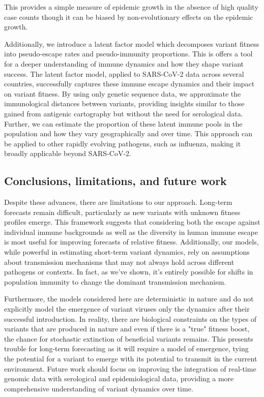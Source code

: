 \documentclass[11pt,oneside,letterpaper]{article}
\begin{document}
This provides a simple measure of epidemic growth in the absence of high quality case counts though it can be biased by non-evolutionary effects on the epidemic growth.

Additionally, we introduce a latent factor model which decomposes variant fitness into pseudo-escape rates and pseudo-immunity proportions.
This is offers a tool for a deeper understanding of immune dynamics and how they shape variant success.
The latent factor model, applied to SARS-CoV-2 data across several countries, successfully captures these immune escape dynamics and their impact on variant fitness.
 By using only genetic sequence data, we approximate the immunological distances between variants, providing insights similar to those gained from antigenic cartography but without the need for serological data.
 Further, we can estimate the proportion of these latent immune pools in the population and how they vary geographically and over time.
 This approach can be applied to other rapidly evolving pathogens, such as influenza, making it broadly applicable beyond SARS-CoV-2.

\subsection*{Conclusions, limitations, and future work}

Despite these advances, there are limitations to our approach.
Long-term forecasts remain difficult, particularly as new variants with unknown fitness profiles emerge.
This framework suggests that considering both the escape against individual immune backgrounds as well as the diversity in human immune escape is most useful for improving forecasts of relative fitness.
Additionally, our models, while powerful in estimating short-term variant dynamics, rely on assumptions about transmission mechanisms that may not always hold across different pathogens or contexts.
In fact, as we've shown, it's entirely possible for shifts in population immunity to change the dominant transmission mechanism.

Furthermore, the models considered here are deterministic in nature and do not explicitly model the emergence of variant viruses only the dynamics after their successful introduction.
In reality, there are biological constraints on the types of variants that are produced in nature and even if there is a "true" fitness boost, the chance for stochastic extinction of beneficial variants remains.
This presents trouble for long-term forecasting as it will require a model of emergence, tying the potential for a variant to emerge with its potential to transmit in the current environment.
Future work should focus on improving the integration of real-time genomic data with serological and epidemiological data, providing a more comprehensive understanding of variant dynamics over time.
\end{document}
